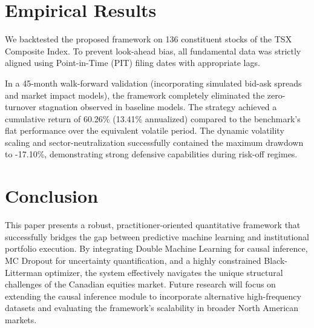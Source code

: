\documentclass[11pt, a4paper]{article}
\begin{document}
\section{Empirical Results}
We backtested the proposed framework on 136 constituent stocks of the TSX Composite Index. To prevent look-ahead bias, all fundamental data was strictly aligned using Point-in-Time (PIT) filing dates with appropriate lags. 

In a 45-month walk-forward validation (incorporating simulated bid-ask spreads and market impact models), the framework completely eliminated the zero-turnover stagnation observed in baseline models. The strategy achieved a cumulative return of 60.26\% (13.41\% annualized) compared to the benchmark's flat performance over the equivalent volatile period. The dynamic volatility scaling and sector-neutralization successfully contained the maximum drawdown to -17.10\%, demonstrating strong defensive capabilities during risk-off regimes.

\section{Conclusion}
This paper presents a robust, practitioner-oriented quantitative framework that successfully bridges the gap between predictive machine learning and institutional portfolio execution. By integrating Double Machine Learning for causal inference, MC Dropout for uncertainty quantification, and a highly constrained Black-Litterman optimizer, the system effectively navigates the unique structural challenges of the Canadian equities market. Future research will focus on extending the causal inference module to incorporate alternative high-frequency datasets and evaluating the framework's scalability in broader North American markets.
\end{document}

